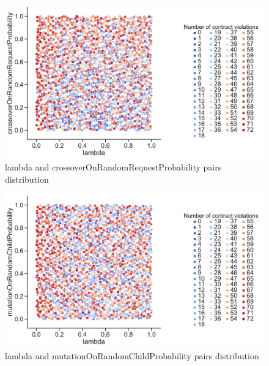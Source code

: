 \begin{figure}
	\centering
	\includegraphics[width=\textwidth]{images/PairsDistr/lambda_crossoverOnRandomRequestProbability.pdf}
	\caption[lambda and crossoverOnRandomRequestProbability pairs distribution]{lambda and crossoverOnRandomRequestProbability pairs distribution}
	\label{fig:lambda_crossoverOnRandomRequestProbability_pair}
\end{figure}
\begin{figure}
	\centering
	\includegraphics[width=\textwidth]{images/PairsDistr/lambda_mutationOnRandomChildProbability.pdf}
	\caption[lambda and mutationOnRandomChildProbability pairs distribution]{lambda and mutationOnRandomChildProbability pairs distribution}
	\label{fig:lambda_mutationOnRandomChildProbability_pair}
\end{figure}
